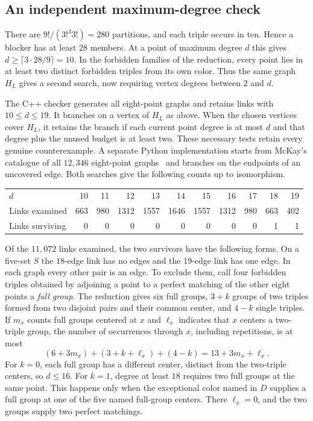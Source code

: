 \documentclass[11pt]{article}
\begin{document}
\subsection{An independent maximum-degree check}

There are $9!/(3!^3 3!)=280$ partitions, and each triple occurs in ten.
Hence a blocker has at least $28$ members. At a point of maximum degree $d$
this gives $d\ge\lceil3\cdot28/9\rceil=10$. In the forbidden families of
the reduction, every point lies in at least two distinct forbidden triples
from its own color. Thus the same graph $H_L$ gives a second search, now
requiring vertex degrees between $2$ and $d$.

The C++ checker generates all eight-point graphs and retains links with
$10\le d\le19$. It branches on a vertex of $H_L$ as above. When the
chosen vertices cover $H_L$, it retains the branch if each current point
degree is at most $d$ and that degree plus the unused budget is at least two.
These necessary tests retain every genuine counterexample. A separate
Python implementation starts from McKay's catalogue of all $12{,}346$
eight-point graphs~\cite{mckay} and branches on the endpoints of an
uncovered edge. Both searches give the following counts up to isomorphism.

\begin{center}\small
\setlength{\tabcolsep}{3.5pt}
\begin{tabular}{lrrrrrrrrrr}
\hline
$d$ & 10&11&12&13&14&15&16&17&18&19\\
Links examined &663&980&1312&1557&1646&1557&1312&980&663&402\\
Links surviving &0&0&0&0&0&0&0&0&1&1\\
\hline
\end{tabular}
\end{center}

Of the $11{,}072$ links examined, the two survivors have the following
forms. On a five-set $S$ the $18$-edge link has no edges and the $19$-edge
link has one edge. In each graph every other pair is an edge.
To exclude them, call four forbidden triples obtained by adjoining a
point to a perfect matching of the other eight points a \emph{full group}.
The reduction gives six full groups, $3+k$ groups of two triples formed
from two disjoint pairs and their common center, and $4-k$ single triples.
If $m_x$ counts full groups centered at $x$ and $\ell_x$ indicates that
$x$ centers a two-triple group, the number of occurrences through $x$,
including repetitions, is at most
\[
 (6+3m_x)+(3+k+\ell_x)+(4-k)=13+3m_x+\ell_x.
\]
For $k=0$, each full group has a different center, distinct from the
two-triple centers, so $d\le16$. For $k=1$, degree at least $18$ requires
two full groups at the same point. This happens only when the exceptional
color named in $D$ supplies a full group at one of the five named full-group
centers. There $\ell_x=0$, and the two groups supply two perfect matchings.
\end{document}
